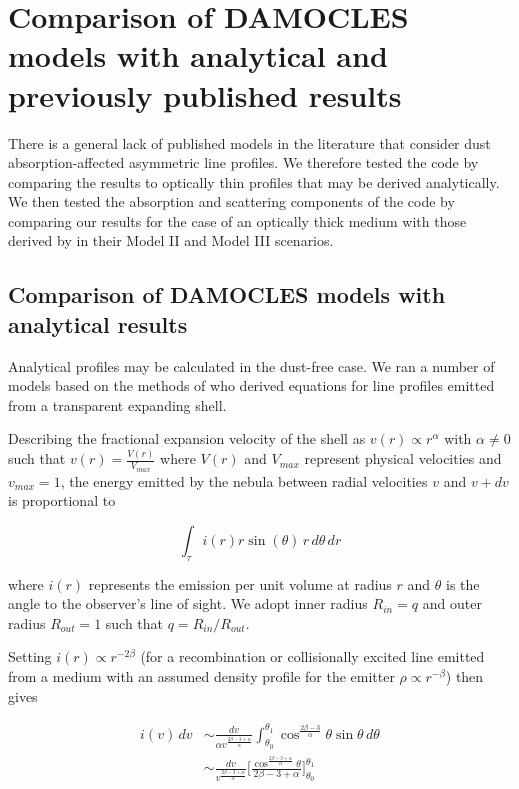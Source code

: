 \documentclass[useAMS,usenatbib,usegraphicx]{mnras}
\begin{document}
\section{Comparison of DAMOCLES models with analytical and previously published results}
\label{params}

There is a general lack of published models in the literature that 
consider dust absorption-affected asymmetric line profiles.  We therefore tested 
the code by comparing the results to optically thin profiles that may be 
derived analytically.  We then tested the absorption and scattering 
components of the code by comparing our results for the case of an 
optically thick medium with those derived by \citet{Lucy1989} in their 
Model II and Model III scenarios.

\subsection{Comparison of DAMOCLES models with analytical results}
\label{analytics}

Analytical profiles may be calculated in the dust-free case.  We ran a 
number of models based on the methods of \cite{Gerasimovic1933} 
who derived equations for line profiles emitted from a transparent 
expanding shell.

Describing the fractional expansion velocity of the shell as $v(r) \propto r^\alpha$ with 
$\alpha \neq 0$ such that $v(r)=\frac{V(r)}{V_{max}}$ where $V(r)$ and $V_{max}$ represent physical velocities and $v_{max}=1$, the energy emitted by 
the nebula between radial velocities $v$ and $v+dv$ is proportional to

\begin{equation}
\int _\tau i(r) r \sin (\theta) \, r \, d\theta \, dr
\end{equation}

\noindent where $i(r)$ represents the emission per unit volume at radius 
$r$ and $\theta$ is the angle to the observer's line of sight.  We adopt inner radius $R_{in}=q$  and outer radius $R_{out}=1$ such that $q=R_{in}/R_{out}$.


Setting $i(r) \propto r^{-2\beta}$ (for a recombination or collisionally excited line emitted from 
a medium with an assumed density profile for the emitter $\rho \propto 
r^{-\beta}$) then gives

\begin{equation}
\begin{split}
i(v) \, dv &\sim \frac{dv}{\alpha v^{\frac{2\beta-3+\alpha}{\alpha}}} \int^{\theta_1}_{\theta_0} \cos^{\frac{2\beta-3}{\alpha}} \theta \sin \theta \, d\theta 
\\
&\sim  \frac{dv}{v^{\frac{2\beta-3+\alpha}{\alpha}}} \Bigg[\frac{\cos^{\frac{2\beta - 3 + \alpha}{\alpha}} \theta}{2\beta -3 + \alpha}\Bigg]^{\theta_1}_{\theta_0}
\end{split}
\end{equation}
\end{document}
